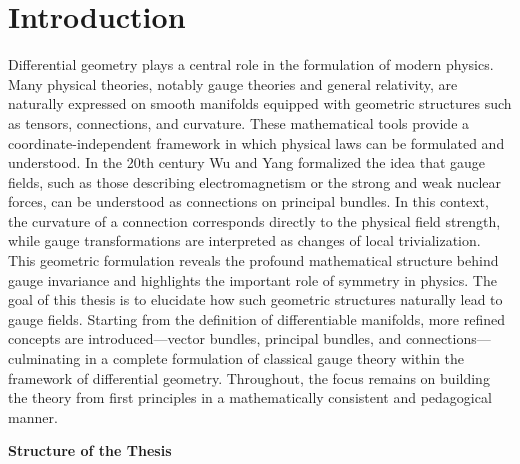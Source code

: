 \chapter{Introduction}

Differential geometry plays a central role in the formulation of modern physics. Many physical theories, notably gauge theories and general relativity, are naturally expressed on smooth manifolds equipped with geometric structures such as tensors, connections, and curvature. These mathematical tools provide a coordinate-independent framework in which physical laws can be formulated and understood. In the 20th century Wu and Yang formalized the idea that gauge fields, such as those describing electromagnetism or the strong and weak nuclear forces, can be understood as connections on principal bundles\cite{WuConceptnonintegrablephasefactorsglobalformulationgaugefields1975}. In this context, the curvature of a connection corresponds directly to the physical field strength, while gauge transformations are interpreted as changes of local trivialization. This geometric formulation reveals the profound mathematical structure behind gauge invariance and highlights the important role of symmetry in physics. The goal of this thesis is to elucidate how such geometric structures naturally lead to gauge fields. Starting from the definition of differentiable manifolds, more refined concepts are introduced—vector bundles, principal bundles, and connections—culminating in a complete formulation of classical gauge theory within the framework of differential geometry. Throughout, the focus remains on building the theory from first principles in a mathematically consistent and pedagogical manner. 

\textbf{Structure of the Thesis}

